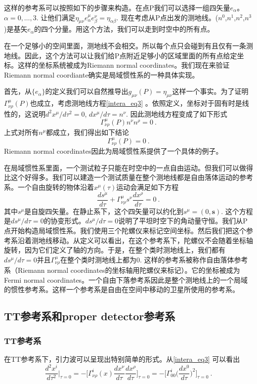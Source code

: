 这样的参考系可以按照如下的步骤来构造。在点P我们可以选择一组四矢量$e_\alpha$。$\alpha = 0,\ldots,3$. 让他们满足$\eta_{\mu\nu}e^\mu_\alpha e^\nu_\beta = \eta_{\alpha\beta}$. 现在考虑从P点出发的测地线。($n^0$,$n^1$,$n^2$,$n^3$)是基矢$e_\alpha$的四个分量。用这个方法，我们可以走到时空中的所有点。

在一个足够小的空间里面，测地线不会相交。所以每个点只会碰到有且仅有一条测地线。因此，这个方法可以让我们给P点附近足够小的区域里面的所有点给定坐标。这样的坐标系统被成为Riemann normal coordinates。我们现在来验证Riemann normal coordiante确实是局域惯性系的一种具体实现。

首先，从$\{e_{\alpha}\}$的定义我们可以自然推导出$g_{\mu\nu}(P) = \eta_{\mu\nu}$这样一个事实。为了证明$\Gamma^\mu_{\nu\rho}(P)$也成立，考虑测地线方程\autoref{intera_eq3} 。依照定义，坐标对于固有时是线性的，这说明$d^2 x^\mu/d \tau^2 = 0$, $dx^\mu/d\tau = n^\nu$. 因此测地线方程变成了如下形式
\begin{equation}
\Gamma^\mu_{\nu\rho} (P) n^\nu n^\rho = 0 ~.
\end{equation}
上式对所有$n^\mu$都成立，我们得出如下结论
\begin{equation}
\Gamma^\mu_{\nu\rho} (P) = 0~.
\end{equation}
Riemann normal coordinates因此为局域惯性系提供了一个具体的例子。

在局域惯性系里面，一个测试粒子只能在时空中的一点自由运动。但我们可以做得比这个好得多。我们可以建造一个测试质量在整个测地线都是自由落体运动的参考系。一个自由旋转的物体沿着$x^\mu(\tau)$运动会满足如下方程
\begin{equation}
\frac{ds^\mu}{d\tau} + \Gamma^\mu_{\nu\rho} s^\nu \frac{dx^\rho}{d\tau} = 0~.
\end{equation}
其中$s^\mu$是自旋四矢量。在静止系下，这个四矢量可以约化到$s^\mu = (0,\mathbf s)$. 这个方程是$ds^\mu/d\tau=0$的协变形式。$ds^\mu/d\tau=0$说明了平坦时空下的角动量守恒。我们从P点开始构造局域惯性系。我们使用三个陀螺仪来标记空间坐标。然后我们把这个参考系沿着测地线移动。从定义可以看出，在这个参考系下，陀螺仪不会随着坐标轴旋转，因为它们定义了轴的方向。于是，在整个类时测地线上，我们都有$ds^\mu/d\tau = 0$并且$\Gamma^\mu_{\nu\rho}$在整个类时测地线上都为0. 这样的参考系被称作自由落体参考系（Riemann normal coordinates的坐标轴用陀螺仪来标记）。它的坐标被成为Fermi normal coordinates。一个自由下落参考系因此是整个测地线上的一个局域的惯性参考系。这样一个参考系是自由在空间中移动的卫星所使用的参考系。

\subsection{TT参考系和proper detector参考系}
\subsubsection{TT参考系}
在TT参考系下，引力波可以呈现出特别简单的形式。从\autoref{intera_eq3} 可以看出
\begin{equation}
\frac{d^2 x^i}{d\tau^2} \bigg|_{\tau = 0} = - \bigg[ \Gamma^i_{\nu\rho} (x) \frac{dx^\nu}{d\tau} \frac{dx^\rho}{d\tau} \bigg]_{\tau = 0} = - \bigg[ \Gamma^i_{00} \bigg( \frac{dx^0}{d\tau} \bigg)^2 \bigg]_{\tau = 0}~.
\end{equation}




